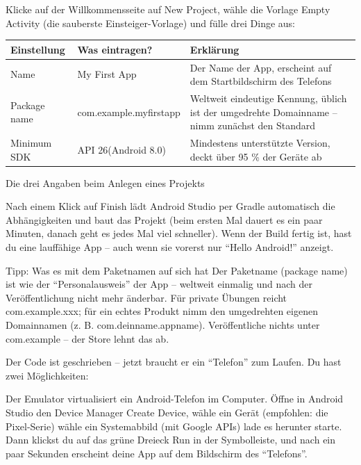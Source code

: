 Klicke auf der Willkommensseite auf New Project, wähle die Vorlage Empty Activity (die sauberste Einsteiger-Vorlage) und fülle drei Dinge aus:

\begin{center}
\begin{tabularx}{\linewidth}{|X|X|X|}
\hline
\textbf{Einstellung} & \textbf{Was eintragen?} & \textbf{Erklärung} \tabularnewline
\hline
Name & My First App & Der Name der App, erscheint auf dem Startbildschirm des Telefons \tabularnewline
Package name & com.example.myfirstapp & Weltweit eindeutige Kennung, üblich ist der umgedrehte Domainname – nimm zunächst den Standard \tabularnewline
Minimum SDK & API 26(Android 8.0) & Mindestens unterstützte Version, deckt über 95 \% der Geräte ab \tabularnewline
\hline
\end{tabularx}
\end{center}

\begin{center}\small\color{gray}Die drei Angaben beim Anlegen eines Projekts\end{center}

Nach einem Klick auf Finish lädt Android Studio per Gradle automatisch die Abhängigkeiten und baut das Projekt (beim ersten Mal dauert es ein paar Minuten, danach geht es jedes Mal viel schneller). Wenn der Build fertig ist, hast du eine lauffähige App – auch wenn sie vorerst nur “Hello Android!” anzeigt.

\begin{tcbinfo}{Tipp: Was es mit dem Paketnamen auf sich hat}
Der Paketname (package name) ist wie der “Personalausweis” der App – weltweit einmalig und nach der Veröffentlichung nicht mehr änderbar. Für private Übungen reicht com.example.xxx; für ein echtes Produkt nimm den umgedrehten eigenen Domainnamen (z. B. com.deinname.appname). Veröffentliche nichts unter com.example – der Store lehnt das ab.

\end{tcbinfo}


Der Code ist geschrieben – jetzt braucht er ein “Telefon” zum Laufen. Du hast zwei Möglichkeiten:


Der Emulator virtualisiert ein Android-Telefon im Computer. Öffne in Android Studio den Device Manager Create Device, wähle ein Gerät (empfohlen: die Pixel-Serie) wähle ein Systemabbild (mit Google APIs) lade es herunter starte. Dann klickst du auf das grüne Dreieck Run in der Symbolleiste, und nach ein paar Sekunden erscheint deine App auf dem Bildschirm des “Telefons”.

